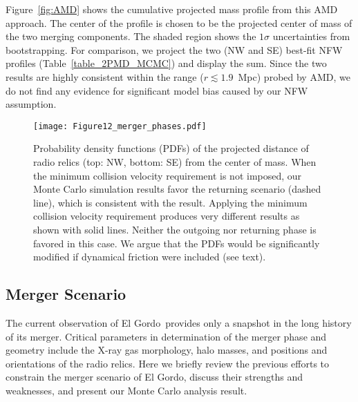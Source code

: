 \documentclass[twocolumn]{aastex631}
\newcommand{\elgordo}{El Gordo}
\begin{document}
Figure~\ref{fig:AMD} shows the cumulative projected mass profile from this AMD approach. The center of the profile is chosen to be the projected center of mass of the two merging components. The shaded region shows the $1\sigma$ uncertainties from bootstrapping. 
For comparison, we project the two (NW and SE) best-fit NFW profiles (Table~\ref{table_2PMD_MCMC}) and display the sum. 
Since the two results are highly consistent within the range ($r\lesssim1.9$~Mpc) probed by AMD, we do not find any evidence for significant model bias caused by our NFW assumption.



\begin{figure}
\centering
\texttt{[image: Figure12\_merger\_phases.pdf]}
\caption{Probability density functions (PDFs) of the projected distance of radio relics (top: NW, bottom: SE) from the center of mass. 
When the minimum collision velocity requirement is not imposed, our Monte Carlo simulation results favor the returning scenario (dashed line), which is consistent with the \cite{Ng2015} result. 
Applying the minimum collision velocity requirement produces very different results as shown with solid lines. Neither the outgoing nor returning phase is favored in this case. We argue that the PDFs would be significantly modified if dynamical friction were included (see text). }
\label{fig:merger_scenario}
\end{figure}




\subsection{Merger Scenario} \label{merger_scenario}
The current observation of \elgordo~provides only a snapshot in the long history of its merger. 
Critical parameters in determination of the merger phase and geometry include the X-ray gas morphology, halo masses, and positions and orientations of the radio relics. Here we briefly review the previous efforts to constrain the merger scenario of \elgordo, discuss their strengths and weaknesses, and present our Monte Carlo analysis result.
\end{document}
